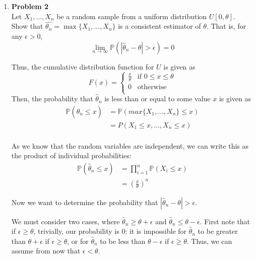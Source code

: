 \documentclass{article}
\newcommand{\gap}{\vspace{1 em}}
\begin{document}
\begin{enumerate}
    \item \textbf{Problem 2} \\
    Let $X_1, \dots, X_n$ be a random sample from a uniform distribution $U[0, \theta]$. Show that $\hat{\theta_n} = \max\{X_1, \dots, X_n\}$ is a consistent estimator of $\theta$. That is, for any $\epsilon > 0$,
    \[
    \lim_{n \to \infty} \mathbb{P}(|\hat{\theta}_n - \theta| > \epsilon) = 0
    \]
    \begin{solution}
    {
        Thus, the cumulative distribution function for $U$ is given as
        \[
        F(x) = \begin{cases}
        \frac{x}{\theta} & \text{if } 0 \leq x \leq \theta \\
        0 & \text{otherwise} \\
        \end{cases}
        \]
        Then, the probability that $\hat{\theta}_n$ is less than or equal to some value $x$ is given as
        \begin{align*}
            \mathbb{P}(\hat{\theta}_n \leq x) &= \mathbb{P}(max\{X_1, \dots, X_n\} \leq x) \\
            &= P(X_1 \leq x, \dots, X_n \leq x) \\
        \end{align*}

        As we know that the random variables are independent, we can write this as the product of individual probabilities:
        \begin{align*}
            \mathbb{P}(\hat{\theta}_n \leq x) & = \prod_{i=1}^n \mathbb{P}(X_i \leq x) \\
            &= \left(\frac{x}{\theta}\right)^n
        \end{align*}

        Now we want to determine the probability that $|\hat{\theta}_n - \theta| > \epsilon$. 

        \gap 
        We must consider two cases, where $\hat{\theta}_n \geq \theta + \epsilon$ and $\hat{\theta}_n \leq \theta - \epsilon$. First note that if $\epsilon \geq \theta$, trivially, our probability is 0: it is impossible for $\hat{\theta}_n$ to be greater than $\theta + \epsilon$ if $\epsilon \geq \theta$, or for $\hat{\theta}_n$ to be less than $\theta - \epsilon$ if $\epsilon \geq \theta$. Thus, we can assume from now that $\epsilon < \theta$.
        \gap

}
\end{solution}
\end{enumerate}
\end{document}
